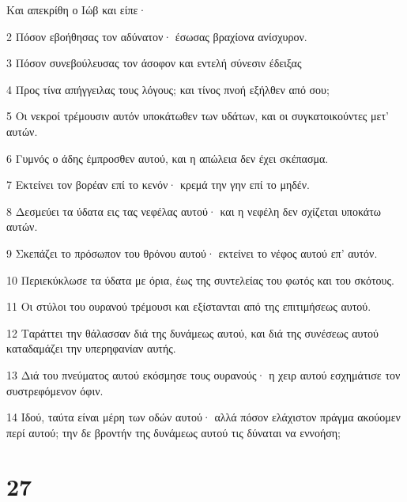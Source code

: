 \par Και απεκρίθη ο Ιώβ και είπε·
\par 2 Πόσον εβοήθησας τον αδύνατον· έσωσας βραχίονα ανίσχυρον.
\par 3 Πόσον συνεβούλευσας τον άσοφον και εντελή σύνεσιν έδειξας
\par 4 Προς τίνα απήγγειλας τους λόγους; και τίνος πνοή εξήλθεν από σου;
\par 5 Οι νεκροί τρέμουσιν αυτόν υποκάτωθεν των υδάτων, και οι συγκατοικούντες μετ' αυτών.
\par 6 Γυμνός ο άδης έμπροσθεν αυτού, και η απώλεια δεν έχει σκέπασμα.
\par 7 Εκτείνει τον βορέαν επί το κενόν· κρεμά την γην επί το μηδέν.
\par 8 Δεσμεύει τα ύδατα εις τας νεφέλας αυτού· και η νεφέλη δεν σχίζεται υποκάτω αυτών.
\par 9 Σκεπάζει το πρόσωπον του θρόνου αυτού· εκτείνει το νέφος αυτού επ' αυτόν.
\par 10 Περιεκύκλωσε τα ύδατα με όρια, έως της συντελείας του φωτός και του σκότους.
\par 11 Οι στύλοι του ουρανού τρέμουσι και εξίστανται από της επιτιμήσεως αυτού.
\par 12 Ταράττει την θάλασσαν διά της δυνάμεως αυτού, και διά της συνέσεως αυτού καταδαμάζει την υπερηφανίαν αυτής.
\par 13 Διά του πνεύματος αυτού εκόσμησε τους ουρανούς· η χειρ αυτού εσχημάτισε τον συστρεφόμενον όφιν.
\par 14 Ιδού, ταύτα είναι μέρη των οδών αυτού· αλλά πόσον ελάχιστον πράγμα ακούομεν περί αυτού; την δε βροντήν της δυνάμεως αυτού τις δύναται να εννοήση;

\chapter{27}

